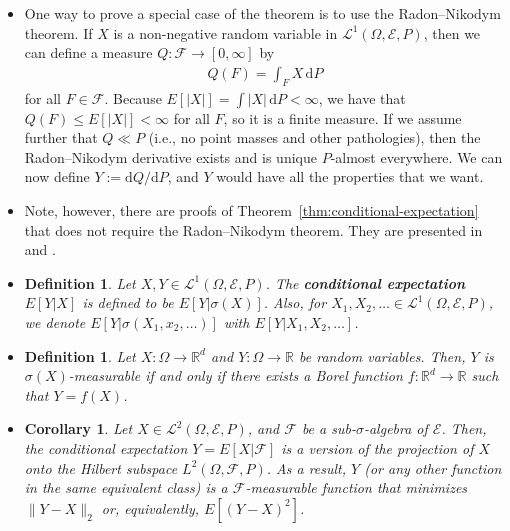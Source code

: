 \documentclass[10pt]{article}
\newtheorem{definition}[lemma]{Definition}
\newtheorem{corollary}[lemma]{Corollary}
\numberwithin{lemma}{section}
\newcommand{\dee}{\mathrm{d}}
\newcommand{\mcal}[1]{\mathcal{#1}}
\newcommand{\Real}{\mathbb{R}}
\begin{document}
\begin{itemize}
  \item One way to prove a special case of the theorem is to use the Radon--Nikodym theorem. If $X$ is a non-negative random variable in $\mcal{L}^1(\Omega, \mcal{E}, P)$, then we can define a measure $Q: \mcal{F} \rightarrow [0,\infty]$ by
  \begin{align*}
    Q(F) = \int_F X \, \dee P
  \end{align*}
  for all $F \in \mcal{F}$. Because $E[|X|] = \int |X|\, \dee P < \infty$, we have that $Q(F) \leq E[|X|] < \infty$ for all $F$, so it is a finite measure. If we assume further that $Q \ll P$ (i.e., no point masses and other pathologies), then the Radon--Nikodym derivative exists and is unique $P$-almost everywhere. We can now define $Y := \dee Q / \dee P$, and $Y$ would have all the properties that we want.

  \item Note, however, there are proofs of Theorem~\ref{thm:conditional-expectation} that does not require the Radon--Nikodym theorem. They are presented in \cite{Williams:1991} and \cite{Jacod:2004}.

  \item \begin{definition}
    Let $X, Y \in \mcal{L}^1(\Omega, \mcal{E}, P)$. The {\bf conditional expectation $E[Y|X]$} is defined to be $E[Y|\sigma(X)]$. Also, for $X_1, X_2, \dotsc \in \mcal{L}^1(\Omega, \mcal{E}, P)$, we denote $E[Y|\sigma(X_1, x_2, \dotsc)]$ with $E[Y|X_1,X_2,\dotsc]$.
  \end{definition}

  \item \begin{definition}
    Let $X: \Omega \rightarrow \Real^d$ and $Y: \Omega \rightarrow \Real$ be random variables. Then, $Y$ is $\sigma(X)$-measurable if and only if there exists a Borel function $f: \Real^d \rightarrow \Real$ such that $Y = f(X)$.
  \end{definition}

  \item \begin{corollary}
    Let $X \in \mcal{L}^2(\Omega, \mcal{E}, P)$, and $\mcal{F}$ be a sub-$\sigma$-algebra of $\mcal{E}$. Then, the conditional expectation $Y = E[X|\mcal{F}]$ is a version of the projection of $X$ onto the Hilbert subspace $L^2(\Omega,\mcal{F},P)$. As a result, $Y$ (or any other function in the same equivalent class) is a $\mcal{F}$-measurable function that minimizes $\| Y - X \|_2$ or, equivalently, $E[(Y - X)^2]$.
  \end{corollary}
  

\end{itemize}
\end{document}

